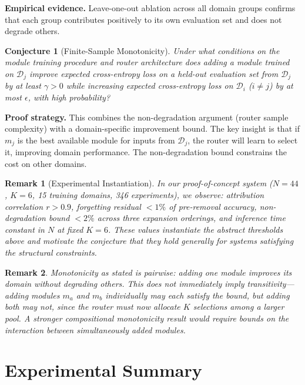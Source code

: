 \documentclass[11pt,a4paper]{article}
\newtheorem{conjecture}{Conjecture}
\newtheorem{remark}{Remark}
\begin{document}
\noindent\textbf{Empirical evidence.} Leave-one-out ablation across all domain groups confirms that each group contributes positively to its own evaluation set and does not degrade others.

\begin{conjecture}[Finite-Sample Monotonicity]
Under what conditions on the module training procedure and router architecture does adding a module trained on $\mathcal{D}_j$ improve expected cross-entropy loss on a held-out evaluation set from $\mathcal{D}_j$ by at least $\gamma > 0$ while increasing expected cross-entropy loss on $\mathcal{D}_i$ ($i \neq j$) by at most $\epsilon$, with high probability?
\end{conjecture}

\noindent\textbf{Proof strategy.} This combines the non-degradation argument (router sample complexity) with a domain-specific improvement bound. The key insight is that if $m_j$ is the best available module for inputs from $\mathcal{D}_j$, the router will learn to select it, improving domain performance. The non-degradation bound constrains the cost on other domains.

\begin{remark}[Experimental Instantiation]
In our proof-of-concept system ($N{=}44$, $K{=}6$, 15 training domains, 346 experiments), we observe: attribution correlation $r > 0.9$, forgetting residual $< 1\%$ of pre-removal accuracy, non-degradation bound $< 2\%$ across three expansion orderings, and inference time constant in $N$ at fixed $K{=}6$. These values instantiate the abstract thresholds above and motivate the conjecture that they hold generally for systems satisfying the structural constraints.
\end{remark}

\begin{remark}
Monotonicity as stated is pairwise: adding one module improves its domain without degrading others. This does not immediately imply transitivity---adding modules $m_a$ and $m_b$ individually may each satisfy the bound, but adding both may not, since the router must now allocate $K$ selections among a larger pool. A stronger compositional monotonicity result would require bounds on the interaction between simultaneously added modules.
\end{remark}

\section{Experimental Summary}
\label{sec:experiments}
\end{document}
